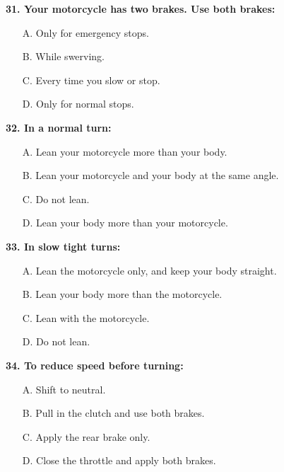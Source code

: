 \begin{minipage}{\linewidth}
\vspace{1em}\noindent\textbf{31. Your motorcycle has two brakes. Use both brakes:}

\begin{itemize}[nosep,leftmargin=2em]
\item [A.] Only for emergency stops.
\item [B.] While swerving.
\item [C.] Every time you slow or stop.
\item [D.] Only for normal stops.

\end{itemize}
\end{minipage}


\begin{minipage}{\linewidth}
\vspace{1em}\noindent\textbf{32. In a normal turn:}

\begin{itemize}[nosep,leftmargin=2em]
\item [A.] Lean your motorcycle more than your body.
\item [B.] Lean your motorcycle and your body at the same angle.
\item [C.] Do not lean.
\item [D.] Lean your body more than your motorcycle.

\end{itemize}
\end{minipage}


\begin{minipage}{\linewidth}
\vspace{1em}\noindent\textbf{33. In slow tight turns:}

\begin{itemize}[nosep,leftmargin=2em]
\item [A.] Lean the motorcycle only, and keep your body straight.
\item [B.] Lean your body more than the motorcycle.
\item [C.] Lean with the motorcycle.
\item [D.] Do not lean.

\end{itemize}
\end{minipage}


\begin{minipage}{\linewidth}
\vspace{1em}\noindent\textbf{34. To reduce speed before turning:}

\begin{itemize}[nosep,leftmargin=2em]
\item [A.] Shift to neutral.
\item [B.] Pull in the clutch and use both brakes.
\item [C.] Apply the rear brake only.
\item [D.] Close the throttle and apply both brakes.

\end{itemize}
\end{minipage}



